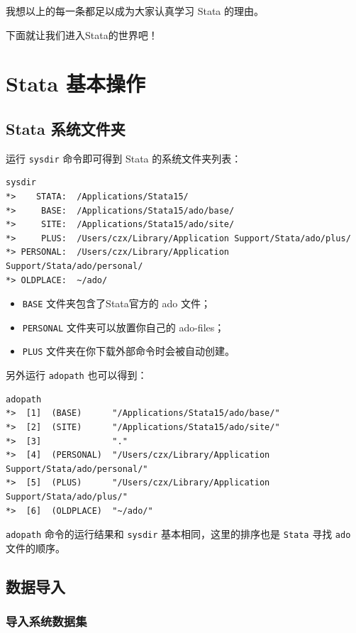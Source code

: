 我想以上的每一条都足以成为大家认真学习 Stata 的理由。

下面就让我们进入Stata的世界吧！

\section{Stata 基本操作}
\subsection{Stata 系统文件夹}

运行 \lstinline{sysdir} 命令即可得到 Stata 的系统文件夹列表：

\begin{lstlisting}
sysdir
*>    STATA:  /Applications/Stata15/
*>     BASE:  /Applications/Stata15/ado/base/
*>     SITE:  /Applications/Stata15/ado/site/
*>     PLUS:  /Users/czx/Library/Application Support/Stata/ado/plus/
*> PERSONAL:  /Users/czx/Library/Application Support/Stata/ado/personal/
*> OLDPLACE:  ~/ado/
\end{lstlisting}

\begin{itemize}
\item  \texttt{BASE} 文件夹包含了Stata官方的 ado 文件；
\item  \texttt{PERSONAL} 文件夹可以放置你自己的 ado-files；
\item  \texttt{PLUS} 文件夹在你下载外部命令时会被自动创建。
\end{itemize}

另外运行 \texttt{adopath} 也可以得到：

\begin{lstlisting}
adopath
*>  [1]  (BASE)      "/Applications/Stata15/ado/base/"
*>  [2]  (SITE)      "/Applications/Stata15/ado/site/"
*>  [3]              "."
*>  [4]  (PERSONAL)  "/Users/czx/Library/Application Support/Stata/ado/personal/"
*>  [5]  (PLUS)      "/Users/czx/Library/Application Support/Stata/ado/plus/"
*>  [6]  (OLDPLACE)  "~/ado/"
\end{lstlisting}

\texttt{adopath} 命令的运行结果和 \texttt{sysdir} 基本相同，这里的排序也是 \texttt{Stata} 寻找 \texttt{ado} 文件的顺序。

\subsection{数据导入}
\subsubsection{导入系统数据集}


